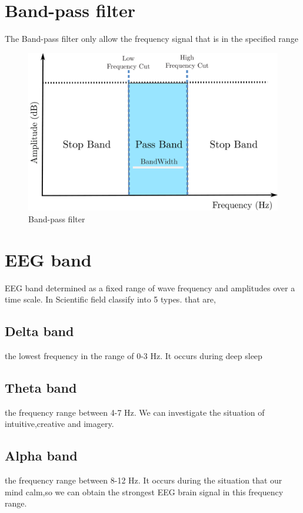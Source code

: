\section{Band-pass filter}
\hspace{1.5cm}The Band-pass filter only allow the frequency signal that is in the specified range
\begin{figure}[ht]
	\centering
	\includegraphics[scale = 0.14]{chapter3/bandpass.pdf}
	\caption{Band-pass filter}
\end{figure}

\newpage
\section{EEG band}
\hspace{1.5cm}EEG band determined as a fixed range of wave frequency and amplitudes over a time scale. In Scientific field classify into 5 types. that are,

\subsection{Delta band} the lowest frequency in the range of 0-3 Hz. It occurs during deep sleep

\subsection{Theta band} the frequency range between 4-7 Hz. We can investigate the situation of intuitive,creative and imagery. 

\subsection{Alpha band} the frequency range between 8-12 Hz. It occurs during the situation that our mind calm,so we can obtain the strongest EEG brain signal in this frequency range.


